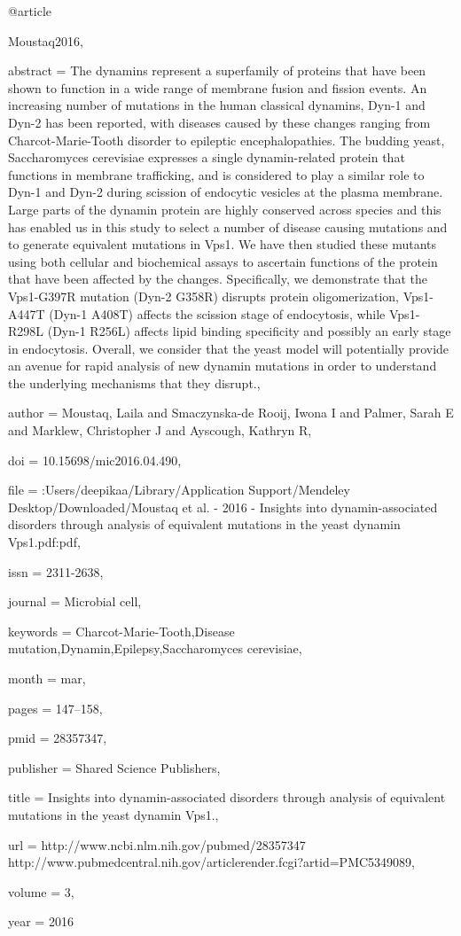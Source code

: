 @article{Moustaq2016,

abstract = {The dynamins represent a superfamily of proteins that have been shown to function in a wide range of membrane fusion and fission events. An increasing number of mutations in the human classical dynamins, Dyn-1 and Dyn-2 has been reported, with diseases caused by these changes ranging from Charcot-Marie-Tooth disorder to epileptic encephalopathies. The budding yeast, Saccharomyces cerevisiae expresses a single dynamin-related protein that functions in membrane trafficking, and is considered to play a similar role to Dyn-1 and Dyn-2 during scission of endocytic vesicles at the plasma membrane. Large parts of the dynamin protein are highly conserved across species and this has enabled us in this study to select a number of disease causing mutations and to generate equivalent mutations in Vps1. We have then studied these mutants using both cellular and biochemical assays to ascertain functions of the protein that have been affected by the changes. Specifically, we demonstrate that the Vps1-G397R mutation (Dyn-2 G358R) disrupts protein oligomerization, Vps1-A447T (Dyn-1 A408T) affects the scission stage of endocytosis, while Vps1-R298L (Dyn-1 R256L) affects lipid binding specificity and possibly an early stage in endocytosis. Overall, we consider that the yeast model will potentially provide an avenue for rapid analysis of new dynamin mutations in order to understand the underlying mechanisms that they disrupt.},

author = {Moustaq, Laila and {Smaczynska-de Rooij}, Iwona I and Palmer, Sarah E and Marklew, Christopher J and Ayscough, Kathryn R},

doi = {10.15698/mic2016.04.490},

file = {:Users/deepikaa/Library/Application Support/Mendeley Desktop/Downloaded/Moustaq et al. - 2016 - Insights into dynamin-associated disorders through analysis of equivalent mutations in the yeast dynamin Vps1.pdf:pdf},

issn = {2311-2638},

journal = {Microbial cell},

keywords = {Charcot-Marie-Tooth,Disease mutation,Dynamin,Epilepsy,Saccharomyces cerevisiae},

month = {mar},

pages = {147--158},

pmid = {28357347},

publisher = {Shared Science Publishers},

title = {{Insights into dynamin-associated disorders through analysis of equivalent mutations in the yeast dynamin Vps1.}},

url = {http://www.ncbi.nlm.nih.gov/pubmed/28357347 http://www.pubmedcentral.nih.gov/articlerender.fcgi?artid=PMC5349089},

volume = {3},

year = {2016}

}

